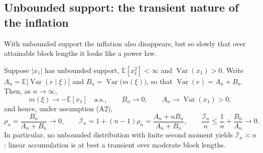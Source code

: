 \documentclass[review,hidelinks,oneeqnum,onetabnum,onefignum,onethmnum]{siamart251216}
\begin{document}
\subsection{Unbounded support: the transient nature of the inflation}
\label{sec:open}

With unbounded support the inflation also disappears, but so slowly that over
attainable block lengths it looks like a power law.

\begin{proposition}
\label{prop:decay}
Suppose $|x_1|$ has unbounded support, $\mathbb E[x_1^2]<\infty$ and
$\operatorname{Var}(x_1)>0$. Write
$A_n=\mathbb E\bigl[\operatorname{Var}(e\mid\xi)\bigr]$ and
$B_n=\operatorname{Var}\bigl(m(\xi)\bigr)$, so that
$\operatorname{Var}(e)=A_n+B_n$. Then, as $n\to\infty$,
\begin{equation}
m(\xi)\longrightarrow-\mathbb E[x_1]\quad\text{a.s.},\qquad
B_n\longrightarrow0,\qquad
A_n\longrightarrow\operatorname{Var}(x_1)>0 ,
\label{eq:decay}
\end{equation}
and hence, under assumption (A2),
\begin{equation}
\rho_n=\frac{B_n}{A_n+B_n}\longrightarrow0,
\qquad
\mathcal I_n=1+(n-1)\rho_n=\frac{A_n+nB_n}{A_n+B_n},
\qquad
\frac{\mathcal I_n}{n}\le\frac1n+\frac{B_n}{A_n}\longrightarrow0 .
\label{eq:decay2}
\end{equation}
In particular, no unbounded distribution with finite second moment yields
$\mathcal I_n\asymp n$: linear accumulation is at best a transient over moderate
block lengths.
\end{proposition}
\end{document}
